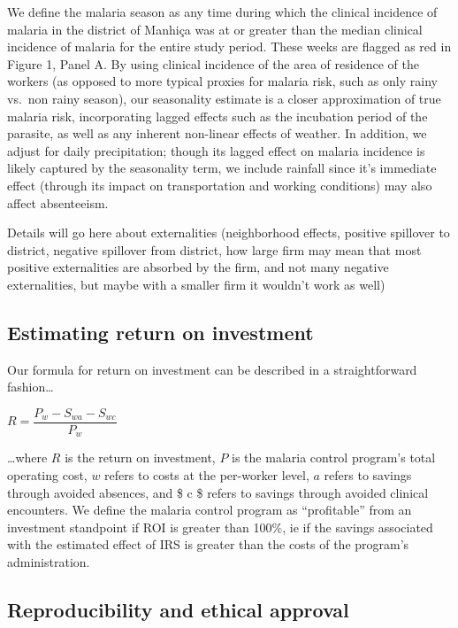 \documentclass[]{article}
\begin{document}
We define the malaria season as any time during which the clinical
incidence of malaria in the district of Manhiça was at or greater than
the median clinical incidence of malaria for the entire study period.
These weeks are flagged as red in Figure 1, Panel A. By using clinical
incidence of the area of residence of the workers (as opposed to more
typical proxies for malaria risk, such as only rainy vs.~non rainy
season), our seasonality estimate is a closer approximation of true
malaria risk, incorporating lagged effects such as the incubation period
of the parasite, as well as any inherent non-linear effects of weather.
In addition, we adjust for daily precipitation; though its lagged effect
on malaria incidence is likely captured by the seasonality term, we
include rainfall since it's immediate effect (through its impact on
transportation and working conditions) may also affect absenteeism.

Details will go here about externalities (neighborhood effects, positive
spillover to district, negative spillover from district, how large firm
may mean that most positive externalities are absorbed by the firm, and
not many negative externalities, but maybe with a smaller firm it
wouldn't work as well)

\subsection{Estimating return on
investment}\label{estimating-return-on-investment}

Our formula for return on investment can be described in a
straightforward fashion\ldots{}

\begin{center}
$R = \dfrac{P_{w} - S_{wa} - S_{wc}}{P_{w}}$

\end{center}

\ldots{}where \(R\) is the return on investment, \(P\) is the malaria
control program's total operating cost, \(w\) refers to costs at the
per-worker level, \(a\) refers to savings through avoided absences, and
\$ c \$ refers to savings through avoided clinical encounters. We define
the malaria control program as ``profitable'' from an investment
standpoint if ROI is greater than 100\%, ie if the savings associated
with the estimated effect of IRS is greater than the costs of the
program's administration.

\subsection{Reproducibility and ethical
approval}\label{reproducibility-and-ethical-approval}
\end{document}
